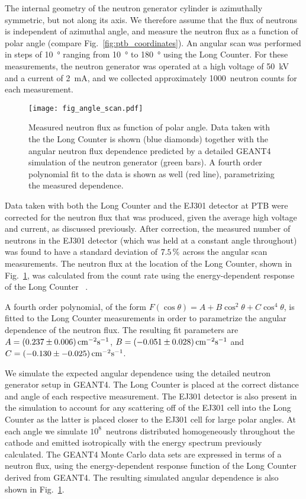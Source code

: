 The internal geometry of the neutron generator cylinder is azimuthally symmetric, but not along its axis. We therefore assume that the flux of neutrons is independent of azimuthal angle, and measure the neutron flux as a function of polar angle (compare Fig.~\ref{fig:ptb_coordinates}). An angular scan was performed in steps of \SI{10}{\degree} ranging from \SI{10}{\degree} to \SI{180}{\degree} using the Long Counter. For these measurements, the neutron generator was operated at a high voltage of \SI{50}{kV} and a current of \SI{2}{mA}, and we collected approximately 1000~neutron counts for each measurement.

\begin{figure}[!htbp]
\centering
\texttt{[image: fig\_angle\_scan.pdf]}
\caption{Measured neutron flux as function of polar angle. Data taken with the the Long Counter is shown (blue diamonds) together with the angular neutron flux dependence predicted by a detailed GEANT4 simulation of the neutron generator (green bars). A fourth order polynomial fit to the data is shown as well (red line), parametrizing the measured dependence.}
\label{Fig:Angle_Scan_Match}
\end{figure}

Data taken with both the Long Counter and the EJ301 detector at PTB were corrected for the neutron flux that was produced, given the average high voltage and current, as discussed previously. After correction, the measured number of neutrons in the EJ301 detector (which was held at a constant angle throughout) was found to have a standard deviation of $7.5\, \mathrm{\%}$ across the angular scan measurements. The neutron flux at the location of the Long Counter, shown in Fig.~\ref{Fig:Angle_Scan_Match}, was calculated from the count rate using the energy-dependent response of the Long Counter ~\cite{npl_report}.

A fourth order polynomial, of the form $F(\cos\theta)=A+B\cos^{2}\theta+C\cos^{4}\theta$, is fitted to the Long Counter measurements in order to parametrize the angular dependence of the neutron flux. The resulting fit parameters are $A=(0.237\pm0.006) \, \mathrm{cm^{-2} s^{-1}}$, $B=(-0.051\pm0.028)\, \mathrm{cm^{-2} s^{-1}}$ and $C=(-0.130\pm-0.025)\, \mathrm{cm^{-2} s^{-1}}$.

We simulate the expected angular dependence using the detailed neutron generator setup in GEANT4. The Long Counter is placed at the correct distance and angle of each respective measurement. The EJ301 detector is also present in the simulation to account for any scattering off of the EJ301 cell into the Long Counter as the latter is placed closer to the EJ301 cell for large polar angles. At each angle we simulate $10^8$~neutrons distributed homogeneously throughout the cathode and emitted isotropically with the energy spectrum previously calculated. The GEANT4 Monte Carlo data sets are expressed in terms of a neutron flux, using the energy-dependent response function of the Long Counter derived from GEANT4. The resulting simulated angular dependence is also shown in Fig.~\ref{Fig:Angle_Scan_Match}.

